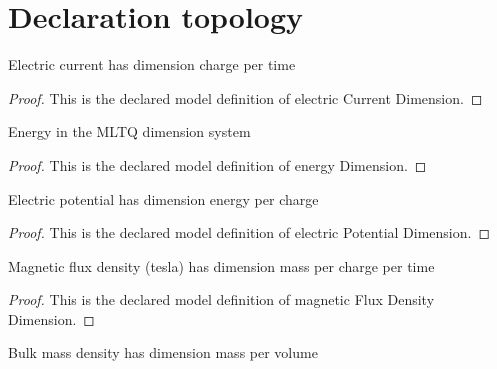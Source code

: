\section{Declaration topology}
\begin{definition}
  \label{def:physics:phyx-mini-0626:phyxminiproblems-problemphyxmini0626-electriccurrentdimension}
  Electric current has dimension charge per time
\end{definition}
\begin{proof}
  This is the declared model definition of electric Current Dimension.
\end{proof}
\begin{definition}
  \label{def:physics:phyx-mini-0626:phyxminiproblems-problemphyxmini0626-energydimension}
  Energy in the MLTQ dimension system
\end{definition}
\begin{proof}
  This is the declared model definition of energy Dimension.
\end{proof}
\begin{definition}
  \label{def:physics:phyx-mini-0626:phyxminiproblems-problemphyxmini0626-electricpotentialdimension}
  Electric potential has dimension energy per charge
\end{definition}
\begin{proof}
  This is the declared model definition of electric Potential Dimension.
\end{proof}
\begin{definition}
  \label{def:physics:phyx-mini-0626:phyxminiproblems-problemphyxmini0626-magneticfluxdensitydimension}
  Magnetic flux density (tesla) has dimension mass per charge per time
\end{definition}
\begin{proof}
  This is the declared model definition of magnetic Flux Density Dimension.
\end{proof}
\begin{definition}
  \label{def:physics:phyx-mini-0626:phyxminiproblems-problemphyxmini0626-massdensitydimension}
  Bulk mass density has dimension mass per volume
\end{definition}
